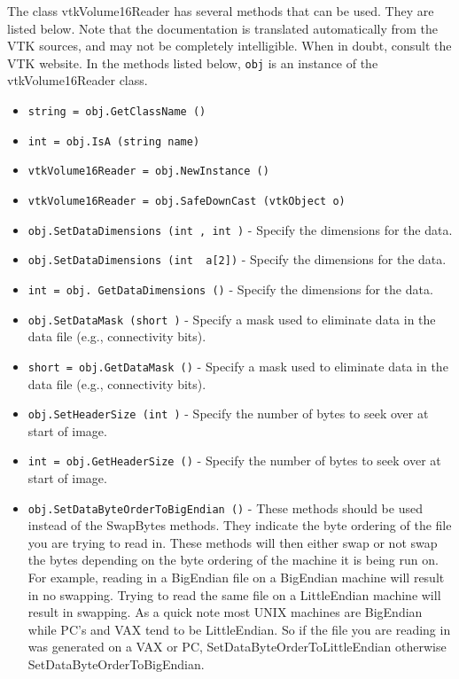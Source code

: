 The class vtkVolume16Reader has several methods that can be used.
  They are listed below.
Note that the documentation is translated automatically from the VTK sources,
and may not be completely intelligible.  When in doubt, consult the VTK website.
In the methods listed below, \verb|obj| is an instance of the vtkVolume16Reader class.
\begin{itemize}
\item  \verb|string = obj.GetClassName ()|

\item  \verb|int = obj.IsA (string name)|

\item  \verb|vtkVolume16Reader = obj.NewInstance ()|

\item  \verb|vtkVolume16Reader = obj.SafeDownCast (vtkObject o)|

\item  \verb|obj.SetDataDimensions (int , int )| -  Specify the dimensions for the data.

\item  \verb|obj.SetDataDimensions (int  a[2])| -  Specify the dimensions for the data.

\item  \verb|int = obj. GetDataDimensions ()| -  Specify the dimensions for the data.

\item  \verb|obj.SetDataMask (short )| -  Specify a mask used to eliminate data in the data file (e.g.,
 connectivity bits).

\item  \verb|short = obj.GetDataMask ()| -  Specify a mask used to eliminate data in the data file (e.g.,
 connectivity bits).

\item  \verb|obj.SetHeaderSize (int )| -  Specify the number of bytes to seek over at start of image.

\item  \verb|int = obj.GetHeaderSize ()| -  Specify the number of bytes to seek over at start of image.

\item  \verb|obj.SetDataByteOrderToBigEndian ()| -  These methods should be used instead of the SwapBytes methods.
 They indicate the byte ordering of the file you are trying
 to read in. These methods will then either swap or not swap
 the bytes depending on the byte ordering of the machine it is
 being run on. For example, reading in a BigEndian file on a
 BigEndian machine will result in no swapping. Trying to read
 the same file on a LittleEndian machine will result in swapping.
 As a quick note most UNIX machines are BigEndian while PC's
 and VAX tend to be LittleEndian. So if the file you are reading
 in was generated on a VAX or PC, SetDataByteOrderToLittleEndian otherwise
 SetDataByteOrderToBigEndian. 


\end{itemize}
